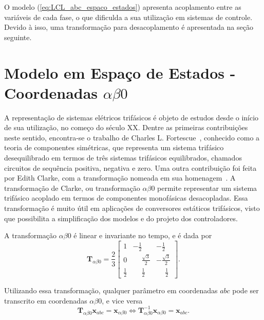     O modelo (\ref{eq:LCL_abc_espaco_estados}) apresenta acoplamento entre as variáveis
    de cada fase, o que dificulda a sua utilização em sistemas de controle. Devido à
    isso, uma transformação para desacoplamento é apresentada na seção seguinte.

\section{Modelo em Espaço de Estados - Coordenadas $\alpha \beta 0$}

    A representação de sistemas elétricos trifásicos é objeto de estudos desde o
    início de sua utilização, no começo do século XX. Dentre as primeiras contribuições
    neste sentido, encontra-se o trabalho de Charles L. Fortescue~\cite{ref:FORTESCUE},
    conhecido como a teoria de componentes simétricas, que representa um sistema trifásico
    desequilibrado em termos de três sistemas trifásicos equilibrados, chamados circuitos
    de sequência positiva, negativa e zero. Uma outra contribuição foi feita por Edith
    Clarke, com a transformação nomeada em sua homenagem~\cite{ref:CLARKE}. A transformação
    de Clarke, ou transformação $\alpha \beta 0$ permite representar um sistema trifásico
    acoplado em termos de componentes monofásicas desacopladas. Essa transformação é muito
    útil em aplicações de conversores estáticos trifásicos, visto que possibilita a
    simplificação dos modelos e do projeto dos controladores.

    A transformação $\alpha \beta 0$ é linear e invariante no tempo, e é dada por
    \begin{equation}
        \mathbf{T}_{\alpha \beta 0} = \frac{2}{3} \left[
        \begin{array}{ccc}
            1 & -\frac{1}{2} & -\frac{1}{2} \\[0.3em]
            0 & \phantom{-}\frac{\sqrt{3}}{2} & -\frac{\sqrt{3}}{2} \\[0.3em]
            \frac{1}{2} &  \phantom{-}\frac{1}{2} & \phantom{-}\frac{1}{2}
        \end{array}
        \right] \text{.}
        \label{eq:alpha_beta_0}
    \end{equation}

    Utilizando essa transformação, qualquer parâmetro em coordenadas $abc$ pode ser
    transcrito em coordenadas $\alpha \beta 0$, e vice versa
    \begin{equation}
        \mathbf{T}_{\alpha \beta 0} \mathbf{x}_{abc} = \mathbf{x}_{\alpha \beta 0}
        \iff
        \mathbf{T}_{\alpha \beta 0}^{-1} \mathbf{x}_{\alpha \beta 0} = \mathbf{x}_{abc}
        \text{.}
    \end{equation}


